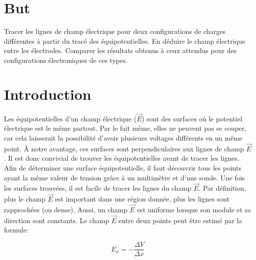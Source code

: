 \documentclass[11pt]{article}
\begin{document}

\setcounter{page}{2}
\section{But}
Tracer les lignes de champ électrique pour deux configurations de charges différentes à partir du tracé des équipotentielles. En déduire le champ électrique entre les électrodes. Comparer les résultats obtenus à ceux attendus pour des configurations électroniques de ces types.\\

\section{Introduction}
Les équipotentielles d’un champ électrique ($\vec{E}$) sont des surfaces où le potentiel électrique est le même partout. Par le fait même, elles ne peuvent pas se couper, car cela laisserait la possibilité d'avoir plusieurs voltages différents en un même point. À notre avantage, ces surfaces sont perpendiculaires aux lignes de champ $\vec{E}$. Il est donc convivial de trouver les équipotentielles avant de tracer les lignes. Afin de déterminer une surface équipotentielle, il faut découvrir tous les points ayant la même valeur de tension grâce à un multimètre et d’une sonde. Une fois les surfaces trouvées, il est facile de tracer les lignes du champ $\vec{E}$. Par définition, plus le champ $\vec{E}$ est important dans une région donnée, plus les lignes sont rapprochées (ou dense). Aussi, un champ $\vec{E}$ est uniforme lorsque son module et sa direction sont constants. Le champ $\vec{E}$ entre deux points peut être estimé par la formule:

\begin{equation}
E_{x}=-\frac{\Delta V}{\Delta x}
\end{equation}
\end{document}
